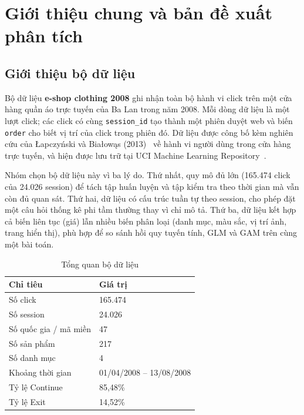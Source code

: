 
\section{Giới thiệu chung và bản đề xuất phân tích}

\subsection{Giới thiệu bộ dữ liệu}

Bộ dữ liệu \textbf{e-shop clothing 2008} ghi nhận toàn bộ hành vi click trên một
cửa hàng quần áo trực tuyến của Ba Lan trong năm 2008. Mỗi dòng dữ liệu là một
lượt click; các click có cùng \texttt{session\_id} tạo thành một phiên duyệt web
và biến \texttt{order} cho biết vị trí của click trong phiên đó. Dữ liệu được
công bố kèm nghiên cứu của {\L}apczy\'nski và Bia{\l}ow{\k a}s
(2013)~\cite{lapczynski2013} về hành vi người dùng trong cửa hàng trực tuyến, và
hiện được lưu trữ tại UCI Machine Learning Repository~\cite{uci_clickstream}.

Nhóm chọn bộ dữ liệu này vì ba lý do. Thứ nhất, quy mô đủ lớn (165.474 click của
24.026 session) để tách tập huấn luyện và tập kiểm tra theo thời gian mà vẫn còn
đủ quan sát. Thứ hai, dữ liệu có cấu trúc tuần tự theo session, cho phép đặt một
câu hỏi thống kê phi tầm thường thay vì chỉ mô tả. Thứ ba, dữ liệu kết hợp cả
biến liên tục (giá) lẫn nhiều biến phân loại (danh mục, màu sắc, vị trí ảnh,
trang hiển thị), phù hợp để so sánh hồi quy tuyến tính, GLM và GAM trên cùng một
bài toán.

\begin{table}[H]
\centering
\caption{Tổng quan bộ dữ liệu}
\label{tab:overview}
\begin{tabular}{ll}
\toprule
\textbf{Chỉ tiêu} & \textbf{Giá trị} \\
\midrule
Số click              & 165.474 \\
Số session            & 24.026 \\
Số quốc gia / mã miền & 47 \\
Số sản phẩm           & 217 \\
Số danh mục           & 4 \\
Khoảng thời gian      & 01/04/2008 -- 13/08/2008 \\
Tỷ lệ Continue        & 85,48\% \\
Tỷ lệ Exit            & 14,52\% \\
\bottomrule
\end{tabular}
\end{table}

